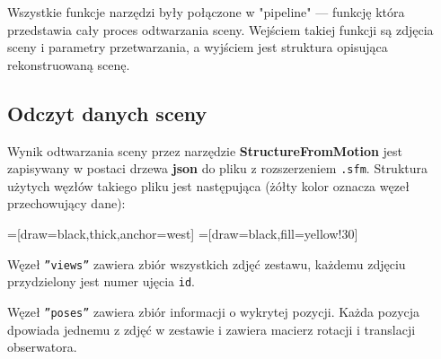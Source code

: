 Wszystkie funkcje narzędzi były połączone w "pipeline" --- funkcję która przedstawia cały proces odtwarzania sceny.
Wejściem takiej funkcji są zdjęcia sceny i parametry przetwarzania, a wyjściem jest struktura opisująca rekonstruowaną scenę. 

\subsection{Odczyt danych sceny}

Wynik odtwarzania sceny przez narzędzie \textbf{StructureFromMotion} jest zapisywany w postaci drzewa \textbf{json} do pliku z rozszerzeniem \texttt{.sfm}.
Struktura użytych węzłów takiego pliku jest następująca (żółty kolor oznacza węzeł przechowujący dane):

=[draw=black,thick,anchor=west]
=[draw=black,fill=yellow!30]

Węzeł \texttt{”views”} zawiera zbiór wszystkich zdjęć zestawu, każdemu zdjęciu przydzielony jest numer ujęcia \texttt{id}.

Węzeł \texttt{”poses”} zawiera zbiór informacji o wykrytej pozycji. Każda pozycja dpowiada jednemu z zdjęć w zestawie i zawiera macierz rotacji i translacji obserwatora.


